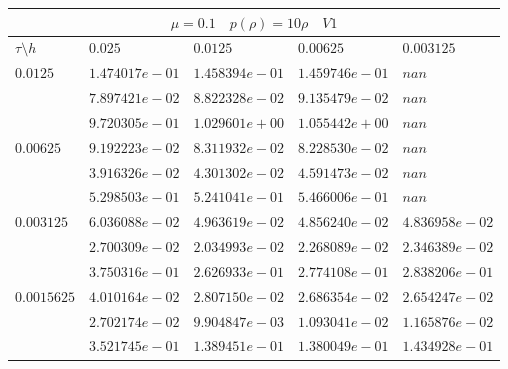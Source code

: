 \documentclass[a4paper,12pt]{extarticle}
\begin{document}
\begin{tabular}{|l|l|l|l|l|}
	\hline
	\multicolumn{5}{|c|}{$\mu =0.1 \quad  p(\rho) =10 \rho \quad V1$}\\
	\hline
	$\tau\setminus h$ & $0.025$ & $0.0125$ & $0.00625$ & $0.003125$\\
	\hline
	$0.0125$  & $1.474017e-01$ & $1.458394e-01$ & $1.459746e-01$ & $nan$\\
	& $7.897421e-02$ & $8.822328e-02$ & $9.135479e-02$ & $nan$\\
	& $9.720305e-01$ & $1.029601e+00$ & $1.055442e+00$ & $nan$\\
	\hline
	$0.00625$  & $9.192223e-02$ & $8.311932e-02$ & $8.228530e-02$ & $nan$\\
	& $3.916326e-02$ & $4.301302e-02$ & $4.591473e-02$ & $nan$\\
	& $5.298503e-01$ & $5.241041e-01$ & $5.466006e-01$ & $nan$\\
	\hline
	$0.003125$  & $6.036088e-02$ & $4.963619e-02$ & $4.856240e-02$ & $4.836958e-02$\\
	& $2.700309e-02$ & $2.034993e-02$ & $2.268089e-02$ & $2.346389e-02$\\
	& $3.750316e-01$ & $2.626933e-01$ & $2.774108e-01$ & $2.838206e-01$\\
	\hline
	$0.0015625$  & $4.010164e-02$ & $2.807150e-02$ & $2.686354e-02$ & $2.654247e-02$\\
	& $2.702174e-02$ & $9.904847e-03$ & $1.093041e-02$ & $1.165876e-02$\\
	& $3.521745e-01$ & $1.389451e-01$ & $1.380049e-01$ & $1.434928e-01$\\
	\hline
\end{tabular}
\end{document}
